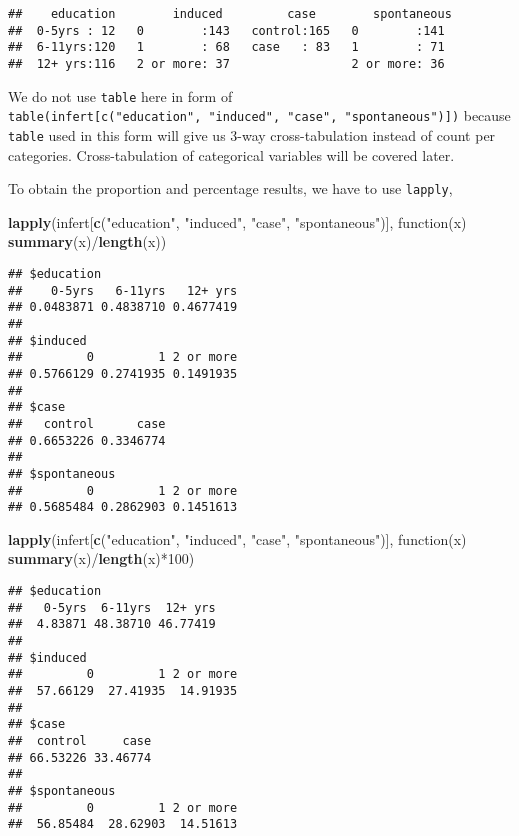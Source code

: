 \documentclass[]{book}
\newenvironment{Shaded}{\begin{snugshade}}{\end{snugshade}}
\newcommand{\KeywordTok}[1]{\textcolor[rgb]{0.13,0.29,0.53}{\textbf{{#1}}}}
\newcommand{\DecValTok}[1]{\textcolor[rgb]{0.00,0.00,0.81}{{#1}}}
\newcommand{\StringTok}[1]{\textcolor[rgb]{0.31,0.60,0.02}{{#1}}}
\newcommand{\NormalTok}[1]{{#1}}
\theoremstyle{definition}
\theoremstyle{definition}
\theoremstyle{remark}
\begin{document}
\begin{verbatim}
##    education        induced         case        spontaneous 
##  0-5yrs : 12   0        :143   control:165   0        :141  
##  6-11yrs:120   1        : 68   case   : 83   1        : 71  
##  12+ yrs:116   2 or more: 37                 2 or more: 36
\end{verbatim}

We do not use \texttt{table} here in form of
\texttt{table(infert{[}c("education",\ "induced",\ "case",\ "spontaneous"){]})}
because \texttt{table} used in this form will give us 3-way
cross-tabulation instead of count per categories. Cross-tabulation of
categorical variables will be covered later.

To obtain the proportion and percentage results, we have to use
\texttt{lapply},

\begin{Shaded}
\begin{Highlighting}[]
\KeywordTok{lapply}\NormalTok{(infert[}\KeywordTok{c}\NormalTok{(}\StringTok{"education"}\NormalTok{, }\StringTok{"induced"}\NormalTok{, }\StringTok{"case"}\NormalTok{, }\StringTok{"spontaneous"}\NormalTok{)], }
       \NormalTok{function(x) }\KeywordTok{summary}\NormalTok{(x)/}\KeywordTok{length}\NormalTok{(x))}
\end{Highlighting}
\end{Shaded}

\begin{verbatim}
## $education
##    0-5yrs   6-11yrs   12+ yrs 
## 0.0483871 0.4838710 0.4677419 
## 
## $induced
##         0         1 2 or more 
## 0.5766129 0.2741935 0.1491935 
## 
## $case
##   control      case 
## 0.6653226 0.3346774 
## 
## $spontaneous
##         0         1 2 or more 
## 0.5685484 0.2862903 0.1451613
\end{verbatim}

\begin{Shaded}
\begin{Highlighting}[]
\KeywordTok{lapply}\NormalTok{(infert[}\KeywordTok{c}\NormalTok{(}\StringTok{"education"}\NormalTok{, }\StringTok{"induced"}\NormalTok{, }\StringTok{"case"}\NormalTok{, }\StringTok{"spontaneous"}\NormalTok{)], }
       \NormalTok{function(x) }\KeywordTok{summary}\NormalTok{(x)/}\KeywordTok{length}\NormalTok{(x)*}\DecValTok{100}\NormalTok{)}
\end{Highlighting}
\end{Shaded}

\begin{verbatim}
## $education
##   0-5yrs  6-11yrs  12+ yrs 
##  4.83871 48.38710 46.77419 
## 
## $induced
##         0         1 2 or more 
##  57.66129  27.41935  14.91935 
## 
## $case
##  control     case 
## 66.53226 33.46774 
## 
## $spontaneous
##         0         1 2 or more 
##  56.85484  28.62903  14.51613
\end{verbatim}
\end{document}
